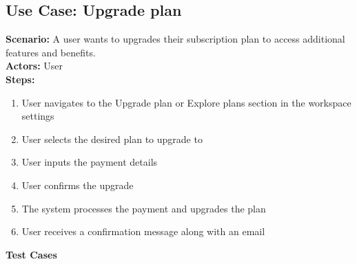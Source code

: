 \documentclass{article}
\begin{document}
\subsection{\textbf{Use Case: Upgrade plan}}
\textbf{Scenario:} A user wants to upgrades their subscription plan to access additional features and benefits.\\
\textbf{Actors:} User\\
\textbf{Steps:}
\begin{enumerate}
\item User navigates to the Upgrade plan or Explore plans section in the workspace settings
\item User selects the desired plan to upgrade to
\item User inputs the payment details
\item User confirms the upgrade
\item The system processes the payment and upgrades the plan
\item User receives a confirmation message along with an email
\end{enumerate}
\textbf{Test Cases}
\end{document}

